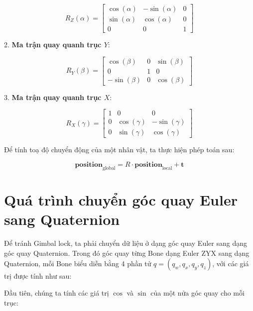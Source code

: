 \[
R_Z(\alpha) = 
\begin{bmatrix}
	\cos(\alpha) & -\sin(\alpha) & 0 \\
	\sin(\alpha) & \cos(\alpha) & 0 \\
	0 & 0 & 1
\end{bmatrix}
\]

2. \textbf{Ma trận quay quanh trục \(Y\)}:

\[
R_Y(\beta) = 
\begin{bmatrix}
	\cos(\beta) & 0 & \sin(\beta) \\
	0 & 1 & 0 \\
	-\sin(\beta) & 0 & \cos(\beta)
\end{bmatrix}
\]

3. \textbf{Ma trận quay quanh trục \(X\)}:

\[
R_X(\gamma) = 
\begin{bmatrix}
	1 & 0 & 0 \\
	0 & \cos(\gamma) & -\sin(\gamma) \\
	0 & \sin(\gamma) & \cos(\gamma)
\end{bmatrix}
\]

Để tính toạ độ chuyển động của một nhân vật, ta thực hiện phép toán sau:

\begin{equation}
	\mathbf{position}_{\text{global}} = R \cdot \mathbf{position}_{\text{local}} + \mathbf{t}
\end{equation}


\section{Quá trình chuyển góc quay Euler sang Quaternion}
\label{appendix:BVHData:QuaternionConvert}



Để tránh Gimbal lock, ta phải chuyển dữ liệu ở dạng góc quay Euler sang dạng góc quay Quaternion. Trong đó góc quay từng Bone dạng Euler ZYX sang dạng Quaternion, mỗi Bone biểu diễn bằng 4 phần tử $q = (q_w, q_x, q_y, q_z)$, với các giá trị được tính như sau:

Đầu tiên, chúng ta tính các giá trị $\cos$ và $\sin$ của một nửa góc quay cho mỗi trục:


